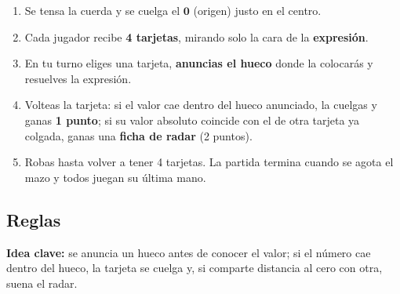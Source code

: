 \documentclass[12pt, letterpaper]{article}
\begin{document}
\begin{enumerate}[leftmargin=*]
  \item Se tensa la cuerda y se cuelga el $\mathbf{0}$ (origen) justo en el centro.
  \item Cada jugador recibe \textbf{4 tarjetas}, mirando solo la cara de la \textbf{expresión}.
  \item En tu turno eliges una tarjeta, \textbf{anuncias el hueco} donde la colocarás y resuelves la expresión.
  \item Volteas la tarjeta: si el valor cae dentro del hueco anunciado, la cuelgas y ganas \textbf{1 punto}; si su valor absoluto coincide con el de otra tarjeta ya colgada, ganas una \textbf{ficha de radar} (2 puntos).
  \item Robas hasta volver a tener 4 tarjetas. La partida termina cuando se agota el mazo y todos juegan su última mano.
\end{enumerate}

\subsection{Reglas}

\textbf{Idea clave:} se anuncia un hueco antes de conocer el valor; si el número cae dentro del hueco, la tarjeta se cuelga y, si comparte distancia al cero con otra, suena el radar.
\end{document}
